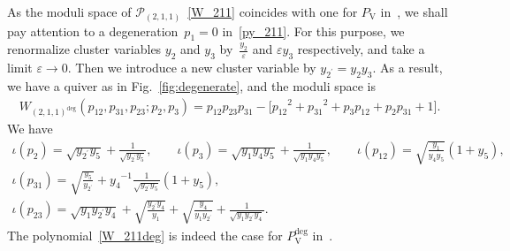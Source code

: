 \documentclass[pdftex]{sigma}
\numberwithin{equation}{section}
\begin{document}
As the moduli space of $\mathcal{P}_{(2,1,1)}$~\eqref{W_211} coincides with one for $P_{\mathrm{V}}$ in~\cite{vdPutSaito09a}, we shall pay attention to a degeneration~$p_1=0$ in~\eqref{py_211}. For this purpose, we renormalize cluster variables $y_2$ and $y_3$ by~$\frac{y_2}{\varepsilon}$ and $\varepsilon y_3$ respectively, and take a limit $\varepsilon\to 0$. Then we introduce a new cluster variable by $y_{2^\prime}=y_2 y_3$. As a result, we have a quiver as in Fig.~\ref{fig:degenerate}, and the moduli space is
\begin{gather} \label{W_211deg}
 W_{(2,1,1)^{\text{deg}}}( p_{12}, p_{31}, p_{23} ; p_2, p_3) = p_{12} p_{23} p_{31} - \big[ {p_{12}}^2 + {p_{31}}^2 + p_3 p_{12} + p_2 p_{31} + 1 \big] .
\end{gather}
We have
\begin{gather}
 \iota(p_2) = \sqrt{ y_{2^\prime} y_5} + \frac{1}{\sqrt{y_{2^\prime} y_5}} , \qquad \iota(p_3) = \sqrt{y_1 y_4 y_5} + \frac{1}{\sqrt{y_1 y_4 y_5}} ,\qquad
 \iota(p_{12}) = \sqrt{\frac{y_1}{y_4 y_5}} ( 1 + y_5) , \nonumber\\
 \iota(p_{31}) = \sqrt{\frac{y_5}{y_{2^\prime}}} + {y_4}^{-1} \frac{1}{\sqrt{y_{2^\prime} y_5}} ( 1+y_5 ),\nonumber \\
 \iota(p_{23}) = \sqrt{y_1 y_{2^\prime} y_4} +\sqrt{\frac{y_{2^\prime} y_4}{y_1}} +\sqrt{\frac{y_4}{y_1 y_{2^\prime}}} +\frac{1}{\sqrt{y_1 y_{2^\prime} y_4 }} .\label{py_211deg}
\end{gather}
The polynomial~\eqref{W_211deg} is indeed the case for $P_{\mathrm{V}}^{\text{deg}}$ in~\cite{vdPutSaito09a}.
\end{document}
